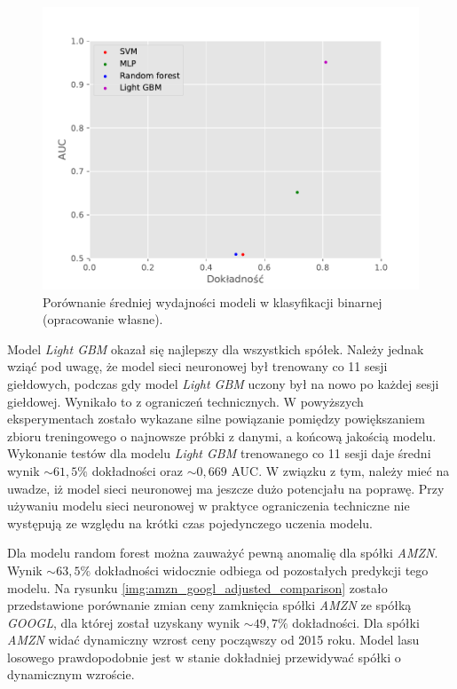 \documentclass[a4paper, twoside, 11pt, openright]{article}
\begin{document}
\begin{figure}[H]
\centering \includegraphics[scale=0.9]{img/summary-binary-summary.pdf}
\caption{Porównanie średniej wydajności modeli w klasyfikacji binarnej (opracowanie własne).}
\label{img:summary-binary}
\end{figure}

\bigskip

Model \textit{Light GBM} okazał się najlepszy dla wszystkich spółek. Należy jednak wziąć pod uwagę, że model sieci neuronowej był trenowany co 11 sesji giełdowych, podczas gdy model \textit{Light GBM} uczony był na nowo po każdej sesji giełdowej. Wynikało to z ograniczeń technicznych. W powyższych eksperymentach zostało wykazane silne powiązanie pomiędzy powiększaniem zbioru treningowego o najnowsze próbki z danymi, a końcową jakością modelu. Wykonanie testów dla modelu \textit{Light GBM} trenowanego co 11 sesji daje średni wynik $\sim 61,5\%$ dokładności oraz $\sim 0,669$ AUC. W związku z tym, należy mieć na uwadze, iż model sieci neuronowej ma jeszcze dużo potencjału na poprawę. Przy używaniu modelu sieci neuronowej w praktyce ograniczenia techniczne nie występują ze względu na krótki czas pojedynczego uczenia modelu.

\bigskip

Dla modelu random forest można zauważyć pewną anomalię dla spółki \textit{AMZN}. Wynik $\sim 63,5\%$ dokładności widocznie odbiega od pozostałych predykcji tego modelu. Na rysunku \ref{img:amzn_googl_adjusted_comparison} zostało przedstawione porównanie zmian ceny zamknięcia spółki \textit{AMZN} ze spółką \textit{GOOGL}, dla której został uzyskany wynik $\sim 49,7\%$ dokładności. Dla spółki \textit{AMZN} widać dynamiczny wzrost ceny począwszy od 2015 roku. Model lasu losowego prawdopodobnie jest w stanie dokładniej przewidywać spółki o dynamicznym wzroście.
\end{document}
